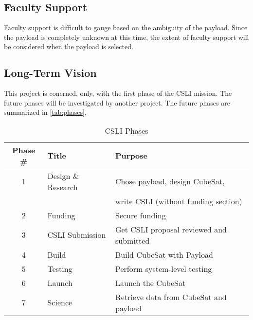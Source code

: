 \documentclass[conference]{IEEEtran} %
\begin{document}
\subsection{Faculty Support}
Faculty support is difficult to gauge based on the ambiguity of the payload. Since the payload is completely unknown at this time, the extent of faculty support will be considered when
the payload is selected.

\subsection{Long-Term Vision}
\label{sec:vision}
This project is conerned, only, with the first phase of the CSLI mission. The future phases will be investigated by another project. The future phases are
summarized in \autoref{tab:phases}.

\begin{table}[h!]
    \caption{CSLI Phases}
    \centering
    \begin{tabular}{@{}cll@{}}
    \toprule
    Phase \# & Title & Purpose \\
    \midrule
    1 & Design \& Research & Chose payload, design CubeSat, \\
      &                    & write CSLI (without funding section) \\
    2 & Funding & Secure funding \\
    3 & CSLI Submission & Get CSLI proposal reviewed and submitted \\
    4 & Build & Build CubeSat with Payload \\
    5 & Testing & Perform system-level testing \\
    6 & Launch & Launch the CubeSat \\
    7 & Science & Retrieve data from CubeSat and payload \\
    \bottomrule
    \end{tabular}
\label{tab:phases}
\end{table}
\end{document}
